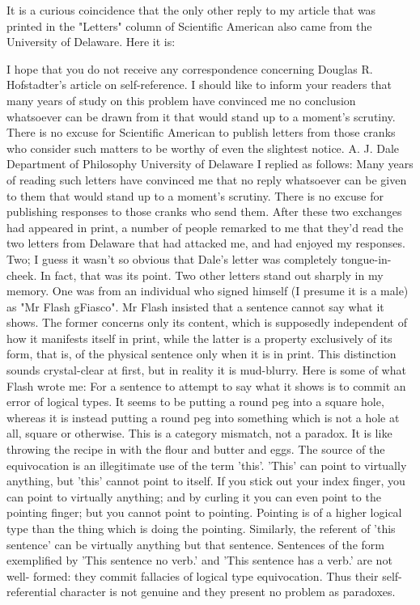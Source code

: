It is a curious coincidence that the only other reply to my article that was printed in the "Letters" column of Scientific American also came from the University of Delaware. Here it is: 



I hope that you do not receive any correspondence concerning Douglas R. Hofstadter's article on self-reference. I should like to inform your readers that many years of study on this problem have convinced me no conclusion whatsoever can be drawn from it that would stand up to a moment's scrutiny. There is no excuse for Scientific American to publish letters from those cranks who consider such matters to be worthy of even the slightest notice. 
A. J. Dale Department of Philosophy University of Delaware 
I replied as follows: 
Many years of reading such letters have convinced me that no reply whatsoever can be given to them that would stand up to a moment's scrutiny. There is no excuse for publishing responses to those cranks who send them. 
After these two exchanges had appeared in print, a number of people remarked to me that they'd read the two letters from Delaware that had attacked me, and had enjoyed my responses. Two; I guess it wasn't so obvious that Dale's letter was completely tongue-in- cheek. In fact, that was its point. 
\separator
Two other letters stand out sharply in my memory. One was from an individual who signed himself (I presume it is a male) as "Mr Flash gFiasco". Mr Flash insisted that a sentence cannot say what it shows. The former concerns only its content, which is supposedly independent of how it manifests itself in print, while the latter is a property exclusively of its form, that is, of the physical sentence only when it is in print. This distinction sounds crystal-clear at first, but in reality it is mud-blurry. Here is some of what Flash wrote me: 
For a sentence to attempt to say what it shows is to commit an error of logical types. It seems to be putting a round peg into a square hole, whereas it is instead putting a round peg into something which is not a hole at all, square or otherwise. This is a category mismatch, not a paradox. It is like throwing the recipe in with the flour and butter and eggs. The source of the equivocation is an illegitimate use of the term 'this'. 'This' can point to virtually anything, but 'this' cannot point to itself. If you stick out your index finger, you can point to virtually anything; and by curling it you can even point to the pointing finger; but you cannot point to pointing. Pointing is of a higher logical type than the thing which is doing the pointing. Similarly, the referent of 'this sentence' can be virtually anything but that sentence. Sentences of the form exemplified by 'This sentence no verb.' and 'This sentence has a verb.' are not well- formed: they commit fallacies of logical type equivocation. Thus their self-referential character is not genuine and they present no problem as paradoxes. 


